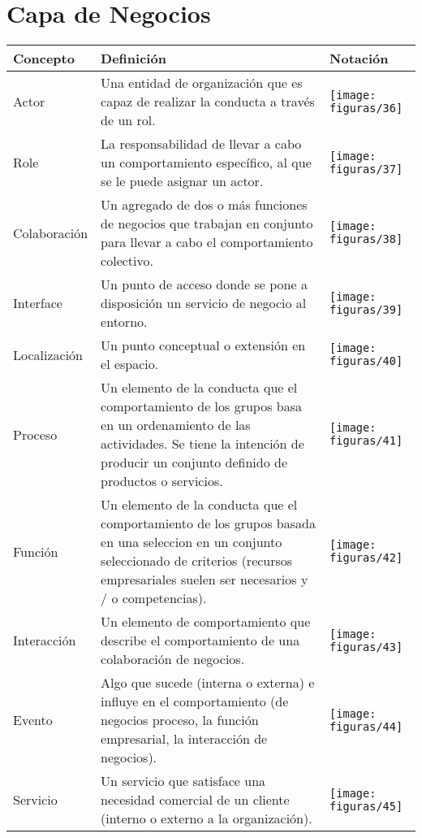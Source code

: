 \section{Capa de Negocios}
  \begin{longtable}
	{m{3cm}m{4.8cm}m{5.2cm}}
	\hline
	\rowcolor[HTML]{0073a1}
	{\color[HTML]{FFFFFF} \textbf{Concepto}} & {\color[HTML]{FFFFFF} \textbf{Definición}} & {\color[HTML]{FFFFFF} \textbf{Notación}} \\
	\hline
	 Actor & Una entidad de organización que es capaz de realizar la conducta a través de un rol. & \texttt{[image: figuras/36]} \\ \hline
	 Role & La responsabilidad de llevar a cabo un comportamiento específico, al que se le puede asignar un actor. & \texttt{[image: figuras/37]} \\ \hline
	 Colaboración & Un agregado de dos o más funciones de negocios que trabajan en conjunto para llevar a cabo el comportamiento colectivo. & \texttt{[image: figuras/38]} \\ \hline
	 Interface & Un punto de acceso donde se pone a disposición un servicio de negocio al entorno. & \texttt{[image: figuras/39]} \\ \hline
	 Localización & Un punto conceptual o extensión en el espacio. & \texttt{[image: figuras/40]} \\ \hline
	 Proceso & Un elemento de la conducta que el comportamiento de los grupos basa en un ordenamiento de las actividades. Se tiene la intención de producir un conjunto definido de productos o servicios. & \texttt{[image: figuras/41]} \\ \hline
	 Función & Un elemento de la conducta que el comportamiento de los grupos basada en una seleccion en un conjunto seleccionado de criterios (recursos empresariales suelen ser necesarios y / o competencias). & \texttt{[image: figuras/42]} \\ \hline
	 Interacción & Un elemento de comportamiento que describe el comportamiento de una colaboración de negocios. & \texttt{[image: figuras/43]} \\ \hline
	 Evento & Algo que sucede (interna o externa) e influye en el comportamiento (de negocios proceso, la función empresarial, la interacción de negocios). & \texttt{[image: figuras/44]} \\ \hline
	 Servicio & Un servicio que satisface una necesidad comercial de un cliente (interno o externo a la organización). & \texttt{[image: figuras/45]} \\ \hline

\end{longtable}
